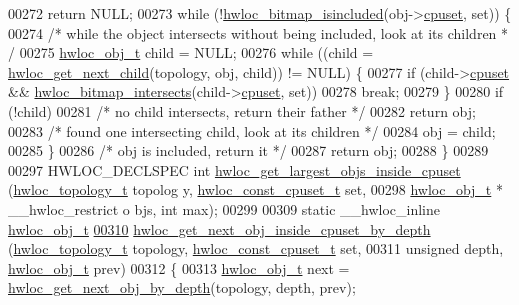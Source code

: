 \begin{DoxyCode}
{{00272     \textcolor{keywordflow}{return} NULL;
00273   \textcolor{keywordflow}{while} (!\hyperlink{a00065_gaae29e14a926c198e8f91e6e4790621e7}{hwloc_bitmap_isincluded}(obj->\hyperlink{a00016_a67925e0f2c47f50408fbdb9bddd0790f}{cpuset}, \textcolor{keyword}{set})) \{
00274     \textcolor{comment}{/* while the object intersects without being included, look at its children *
      /}
00275     \hyperlink{a00016}{hwloc_obj_t} child = NULL;
00276     \textcolor{keywordflow}{while} ((child = \hyperlink{a00053_gae5ef1af636849f77714e1584ba78cf9c}{hwloc_get_next_child}(topology, obj, child)) != NULL) \{
00277       \textcolor{keywordflow}{if} (child->\hyperlink{a00016_a67925e0f2c47f50408fbdb9bddd0790f}{cpuset} && \hyperlink{a00065_ga575c27953709a8cb9a047aae65157526}{hwloc_bitmap_intersects}(child->\hyperlink{a00016_a67925e0f2c47f50408fbdb9bddd0790f}{cpuset}, \textcolor{keyword}{set}))
00278         \textcolor{keywordflow}{break};
00279     \}
00280     \textcolor{keywordflow}{if} (!child)
00281       \textcolor{comment}{/* no child intersects, return their father */}
00282       \textcolor{keywordflow}{return} obj;
00283     \textcolor{comment}{/* found one intersecting child, look at its children */}
00284     obj = child;
00285   \}
00286   \textcolor{comment}{/* obj is included, return it */}
00287   \textcolor{keywordflow}{return} obj;
00288 \}
00289 
00297 HWLOC\_DECLSPEC \textcolor{keywordtype}{int} \hyperlink{a00054_gaab04c89623662e63a48ed2cd48eb601c}{hwloc_get_largest_objs_inside_cpuset} (\hyperlink{a00039_ga9d1e76ee15a7dee158b786c30b6a6e38}{hwloc_topology_t} topolog
      y, \hyperlink{a00040_ga1f784433e9b606261f62d1134f6a3b25}{hwloc_const_cpuset_t} \textcolor{keyword}{set},
00298                                                  \hyperlink{a00016}{hwloc_obj_t} * \_\_hwloc\_restrict o
      bjs, \textcolor{keywordtype}{int} max);
00299 
00309 \textcolor{keyword}{static} \_\_hwloc\_inline \hyperlink{a00016}{hwloc_obj_t}
\hypertarget{a00031_source_l00310}{}\hyperlink{a00054_ga8af256c2572f16520f95440b884c1bd6}{00310} \hyperlink{a00054_ga8af256c2572f16520f95440b884c1bd6}{hwloc_get_next_obj_inside_cpuset_by_depth} (\hyperlink{a00039_ga9d1e76ee15a7dee158b786c30b6a6e38}{hwloc_topology_t} topology, 
      \hyperlink{a00040_ga1f784433e9b606261f62d1134f6a3b25}{hwloc_const_cpuset_t} \textcolor{keyword}{set},
00311                                            \textcolor{keywordtype}{unsigned} depth, \hyperlink{a00016}{hwloc_obj_t} prev)
00312 \{
00313   \hyperlink{a00016}{hwloc_obj_t} next = \hyperlink{a00053_gab7c1dce3f42ece5bfa621e87cf332418}{hwloc_get_next_obj_by_depth}(topology, depth, prev);
}}
\end{DoxyCode}
